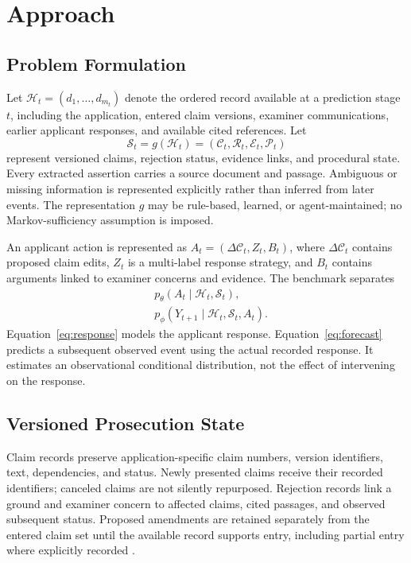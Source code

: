 \documentclass[11pt]{article}
\newcommand{\hist}{\mathcal{H}}
\newcommand{\state}{\mathcal{S}}
\newcommand{\claims}{\mathcal{C}}
\newcommand{\rejects}{\mathcal{R}}
\newcommand{\evidence}{\mathcal{E}}
\begin{document}
\section{Approach}
\label{sec:approach}

\subsection{Problem Formulation}
\label{sec:approach-formulation}

Let $\hist_t=(d_1,\ldots,d_{m_t})$ denote the ordered record available at a prediction stage $t$, including the application, entered claim versions, examiner communications, earlier applicant responses, and available cited references. Let
\begin{equation}
    \state_t=g(\hist_t)
    =(\claims_t,\rejects_t,\evidence_t,\mathcal{P}_t)
\end{equation}
represent versioned claims, rejection status, evidence links, and procedural state. Every extracted assertion carries a source document and passage. Ambiguous or missing information is represented explicitly rather than inferred from later events. The representation $g$ may be rule-based, learned, or agent-maintained; no Markov-sufficiency assumption is imposed.

An applicant action is represented as $A_t=(\Delta\claims_t,Z_t,B_t)$, where $\Delta\claims_t$ contains proposed claim edits, $Z_t$ is a multi-label response strategy, and $B_t$ contains arguments linked to examiner concerns and evidence. The benchmark separates
\begin{align}
    &p_{\theta}(A_t\mid\hist_t,\state_t), \label{eq:response}\\
    &p_{\phi}(Y_{t+1}\mid\hist_t,\state_t,A_t). \label{eq:forecast}
\end{align}
Equation~\ref{eq:response} models the applicant response. Equation~\ref{eq:forecast} predicts a subsequent observed event using the actual recorded response. It estimates an observational conditional distribution, not the effect of intervening on the response.

\subsection{Versioned Prosecution State}
\label{sec:approach-state}

Claim records preserve application-specific claim numbers, version identifiers, text, dependencies, and status. Newly presented claims receive their recorded identifiers; canceled claims are not silently repurposed. Rejection records link a ground and examiner concern to affected claims, cited passages, and observed subsequent status. Proposed amendments are retained separately from the entered claim set until the available record supports entry, including partial entry where explicitly recorded \citep{usptompep714}.
\end{document}
